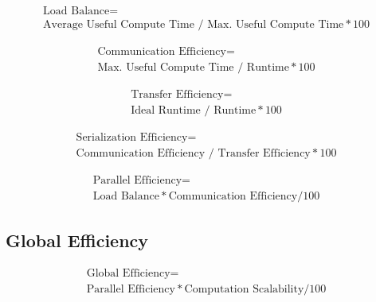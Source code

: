 \documentclass[article,12pt]{memoir}
\begin{document}
	\begin{equation}\label{loadbalance}
		\begin{gathered}
			\text{Load Balance} =\\
			\text{Average Useful Compute Time } / \text{ Max. Useful Compute Time} * 100
		\end{gathered}
	\end{equation}
	
	\begin{equation}\label{commeff}
		\begin{gathered}
			\text{Communication Efficiency} =\\
			\text{Max. Useful Compute Time } / \text{ Runtime} * 100
		\end{gathered}
	\end{equation}
	
	\begin{equation}\label{transfeff}
		\begin{gathered}
			\text{Transfer Efficiency} =\\
			\text{Ideal Runtime } / \text{ Runtime} * 100
		\end{gathered}
	\end{equation}
	
	\begin{equation}\label{serialeff}
		\begin{gathered}
			\text{Serialization Efficiency} =\\
			\text{Communication Efficiency } / \text{ Transfer Efficiency} * 100
		\end{gathered}
	\end{equation}
	
	\begin{equation}\label{pareff}
		\begin{gathered}
			\text{Parallel Efficiency} =\\
			\text{Load Balance} * \text{Communication Efficiency} / 100
		\end{gathered}
	\end{equation}
	
	\subsection{Global Efficiency}
	
	\begin{equation}\label{globeff}
		\begin{gathered}
			\text{Global Efficiency} =\\
			\text{Parallel Efficiency} * \text{Computation Scalability} / 100
		\end{gathered}
	\end{equation}
	
\end{document}

